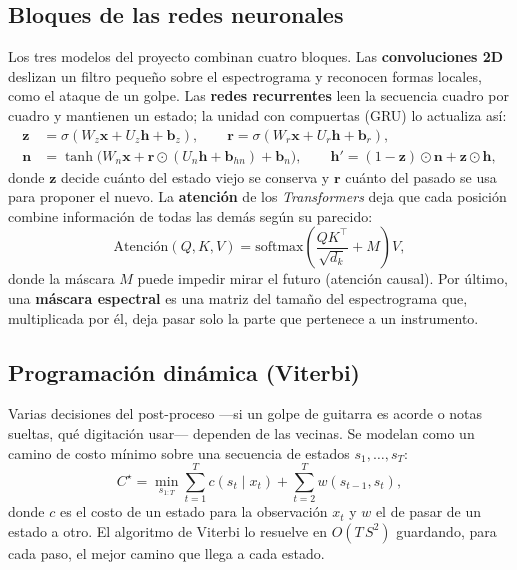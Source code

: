 \documentclass[11pt,a4paper]{article}
\begin{document}
\subsection{Bloques de las redes neuronales}
Los tres modelos del proyecto combinan cuatro bloques. Las \textbf{convoluciones 2D} deslizan un filtro
pequeño sobre el espectrograma y reconocen formas locales, como el ataque de un golpe. Las \textbf{redes
recurrentes} leen la secuencia cuadro por cuadro y mantienen un estado; la unidad con compuertas (GRU)
lo actualiza así:
\begin{align}
\mathbf{z} &= \sigma(W_z\mathbf{x} + U_z\mathbf{h} + \mathbf{b}_z), \qquad
\mathbf{r} = \sigma(W_r\mathbf{x} + U_r\mathbf{h} + \mathbf{b}_r),\\
\mathbf{n} &= \tanh\!\big(W_n\mathbf{x} + \mathbf{r}\odot(U_n\mathbf{h}+\mathbf{b}_{hn}) + \mathbf{b}_n\big), \qquad
\mathbf{h}' = (1-\mathbf{z})\odot\mathbf{n} + \mathbf{z}\odot\mathbf{h},
\end{align}
donde $\mathbf{z}$ decide cuánto del estado viejo se conserva y $\mathbf{r}$ cuánto del pasado se usa
para proponer el nuevo. La \textbf{atención} de los \emph{Transformers} deja que cada posición combine
información de todas las demás según su parecido:
\begin{equation}
\mathrm{Atención}(Q,K,V) = \mathrm{softmax}\!\left(\frac{QK^\top}{\sqrt{d_k}} + M\right)V,
\end{equation}
donde la máscara $M$ puede impedir mirar el futuro (atención causal). Por último, una \textbf{máscara
espectral} es una matriz del tamaño del espectrograma que, multiplicada por él, deja pasar solo la parte
que pertenece a un instrumento.

\subsection{Programación dinámica (Viterbi)}
Varias decisiones del post-proceso ---si un golpe de guitarra es acorde o notas sueltas, qué digitación
usar--- dependen de las vecinas. Se modelan como un camino de costo mínimo sobre una secuencia de
estados $s_1,\dots,s_T$:
\begin{equation}
C^\star = \min_{s_{1:T}} \sum_{t=1}^{T} c(s_t \mid x_t) + \sum_{t=2}^{T} w(s_{t-1}, s_t),
\end{equation}
donde $c$ es el costo de un estado para la observación $x_t$ y $w$ el de pasar de un estado a otro. El
algoritmo de Viterbi lo resuelve en $O(T\,S^2)$ guardando, para cada paso, el mejor camino que llega a
cada estado.
\end{document}

